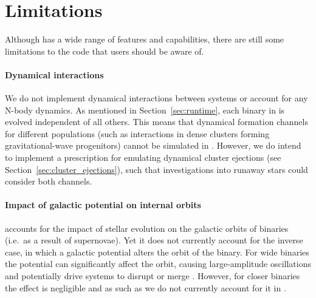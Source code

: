 \documentclass[twocolumn, twocolappendix, oneside]{aastex631}
\begin{document}



\section{Limitations}\label{sec:limitations}

Although \cogsworth has a wide range of features and capabilities, there are still some limitations to the code that users should be aware of.

\paragraph{Dynamical interactions} We do not implement dynamical interactions between systems or account for any N-body dynamics. As mentioned in Section~\ref{sec:runtime}, each binary in \cogsworth is evolved independent of all others. This means that dynamical formation channels for different populations (such as interactions in dense clusters forming gravitational-wave progenitors) cannot be simulated in \cogsworth. However, we do intend to implement a prescription for emulating dynamical cluster ejections (see Section~\ref{sec:cluster_ejections}), such that investigations into runaway stars could consider both channels.

\paragraph{Impact of galactic potential on internal orbits} \cogsworth accounts for the impact of stellar evolution on the galactic orbits of binaries (i.e.\ as a result of supernovae). Yet it does not currently account for the inverse case, in which a galactic potential alters the orbit of the binary. For wide binaries the potential can significantly affect the orbit, causing large-amplitude oscillations and potentially drive systems to disrupt or merge \citep[e.g.,][]{Weinberg+1987:1987ApJ...312..367W,Heisler+1986:1986Icar...65...13H,Jiang+2010:2010MNRAS.401..977J,Modak+2023:2023MNRAS.524.3102M,Stegmann+2024:2024arXiv240502912S}. However, for closer binaries the effect is negligible and as such as we do not currently account for it in \cogsworth.
\end{document}
